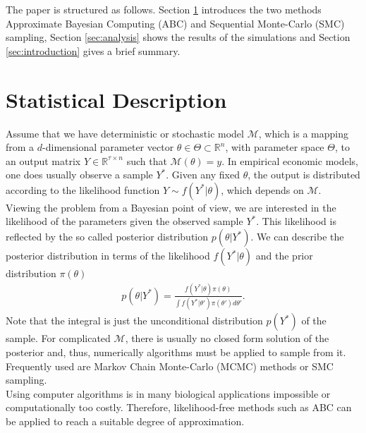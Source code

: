 \documentclass[11pt, a4paper, leqno]{article}
\begin{document}
The paper is structured as follows. Section \ref{sec:stat_description} introduces the two methods Approximate Bayesian Computing (ABC) and Sequential Monte-Carlo (SMC) sampling, Section \ref{sec:analysis} shows the results of the simulations and Section \ref{sec:introduction} gives a brief summary.



\section{Statistical Description}
\label{sec:stat_description}
Assume that we have deterministic or stochastic model $\mathcal{M}$, which is a mapping from a $d$-dimensional parameter vector $\theta \in \Theta \subset \mathbb{R}^n$, with parameter space $\Theta$, to an output matrix $Y \in \mathbb{R}^{\tau \times n}$ such that $\mathcal{M}(\theta) = y$. In empirical economic models, one does usually observe a sample $Y^*$. Given any fixed $\theta$, the output is distributed according to the likelihood function $Y \sim f(Y^*| \theta)$, which depends on $\mathcal{M}$. \\
Viewing the problem from a Bayesian point of view, we are interested in the likelihood of the parameters given the observed sample $Y^*$. This likelihood is reflected by the so called posterior distribution $p(\theta|Y^*)$. We can describe the posterior distribution in terms of the likelihood $f(Y^*| \theta)$ and the prior distribution $\pi(\theta)$
\begin{align}
    p(\theta|Y^*) = \frac{f(Y^*| \theta) \pi(\theta) }{\int f(Y^*| \theta') \pi(\theta') d\theta'}.
\end{align}
Note that the integral is just the unconditional distribution $p(Y^*)$ of the sample. For complicated $\mathcal{M}$, there is usually no closed form solution of the posterior and, thus, numerically algorithms must be applied to sample from it. Frequently used are Markov Chain Monte-Carlo (MCMC) methods or SMC sampling. \\
Using computer algorithms is in many biological applications impossible or computationally too costly. Therefore, likelihood-free methods such as ABC can be applied to reach a suitable degree of approximation.
\end{document}
